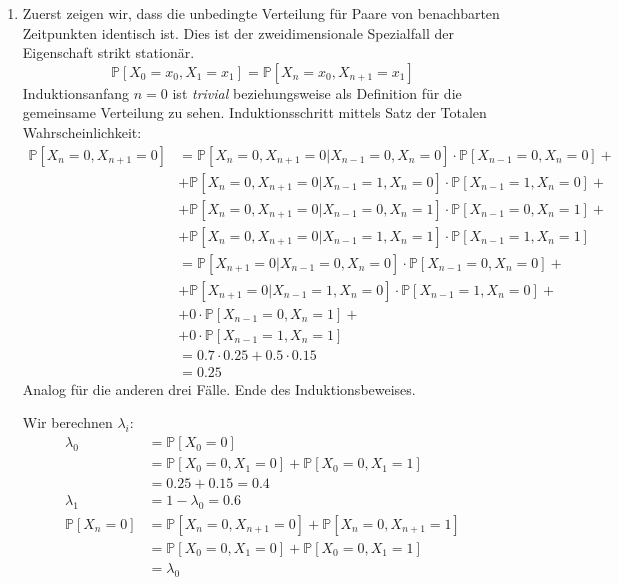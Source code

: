 \documentclass[a4paper,11pt,notitlepage,fullpage]{article}
\newcommand{\pp}[1]{\mathbb P\left[#1\right]}
\begin{document}
\begin{enumerate}
\item Zuerst zeigen wir, dass die unbedingte Verteilung für Paare von benachbarten Zeitpunkten identisch ist. Dies ist der zweidimensionale Spezialfall der Eigenschaft strikt stationär.
$$\pp{X_0 = x_0, X_1 = x_1} = \pp{X_{n} = x_0, X_{n+1} = x_1}$$
Induktionsanfang $n=0$ ist \emph{trivial} beziehungsweise als Definition für die gemeinsame Verteilung zu sehen.
Induktionsschritt mittels Satz der Totalen Wahrscheinlichkeit:
\begin{align*}
\pp{X_n = 0, X_{n+1} = 0} &=
\pp{X_n = 0, X_{n+1} = 0 | X_{n-1} = 0, X_n = 0} \cdot \pp{X_{n-1} = 0, X_n = 0} + \\
&+ \pp{X_n = 0, X_{n+1} = 0 | X_{n-1} = 1, X_n = 0} \cdot \pp{X_{n-1} = 1, X_n = 0} + \\
&+ \pp{X_n = 0, X_{n+1} = 0 | X_{n-1} = 0, X_n = 1} \cdot \pp{X_{n-1} = 0, X_n = 1} + \\
&+ \pp{X_n = 0, X_{n+1} = 0 | X_{n-1} = 1, X_n = 1} \cdot \pp{X_{n-1} = 1, X_n = 1} \\
&= \pp{X_{n+1} = 0 | X_{n-1} = 0, X_n = 0} \cdot \pp{X_{n-1} = 0, X_n = 0} + \\
&+ \pp{X_{n+1} = 0 | X_{n-1} = 1, X_n = 0} \cdot \pp{X_{n-1} = 1, X_n = 0} + \\
&+ 0 \cdot \pp{X_{n-1} = 0, X_n = 1} + \\
&+ 0 \cdot \pp{X_{n-1} = 1, X_n = 1} \\
&= 0.7 \cdot 0.25 + 0.5 \cdot 0.15 \\
&= 0.25
\end{align*}
Analog für die anderen drei Fälle. Ende des Induktionsbeweises.

Wir berechnen $\lambda_i$:
\begin{align*}
\lambda_0 &= \pp{X_0 = 0} \\
&= \pp{X_0 = 0, X_1 = 0} + \pp{X_0 = 0, X_1 = 1} \\
&= 0.25+0.15 = 0.4 \\
\lambda_1 &= 1-\lambda_0 = 0.6 \\
\pp{X_n = 0} &= \pp{X_n = 0, X_{n+1} = 0} + \pp{X_n = 0, X_{n+1} = 1} \\
&= \pp{X_0 = 0, X_1 = 0} + \pp{X_0 = 0, X_1 = 1} \\
&= \lambda_0
\end{align*}


\end{enumerate}
\end{document}
